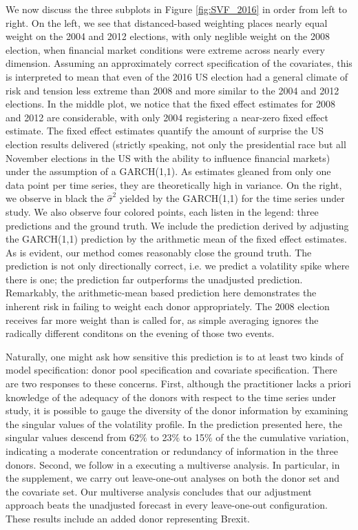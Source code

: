 \documentclass[11pt,3p,review,authoryear]{elsarticle}
\theoremstyle{definition}
\begin{document}
We now discuss the three subplots in Figure \ref{fig:SVF_2016} in order from left to right.  On the left, we see that distanced-based weighting places nearly equal weight on the 2004 and 2012 elections, with only neglible weight on the 2008 election, when financial market conditions were extreme across nearly every dimension.  Assuming an approximately correct specification of the covariates, this is interpreted to mean that even of the 2016 US election had a general climate of risk and tension less extreme than 2008 and more similar to the 2004 and 2012 elections.  In the middle plot, we notice that the fixed effect estimates for 2008 and 2012 are considerable, with only 2004 registering a near-zero fixed effect estimate.  The fixed effect estimates quantify the amount of surprise the US election results delivered (strictly speaking, not only the presidential race but all November elections in the US with the ability to influence financial markets) under the assumption of a GARCH(1,1).  As estimates gleaned from only one data point per time series, they are theoretically high in variance.  On the right, we observe in black the  $\hat\sigma^{2}$ yielded by the GARCH(1,1) for the time series under study.  We also observe four colored points, each listen in the legend: three predictions and the ground truth.  We include the prediction derived by adjusting the GARCH(1,1) prediction by the arithmetic mean of the fixed effect estimates.  As is evident, our method comes reasonably close the ground truth.  The prediction is not only directionally correct, i.e. we predict a volatility spike where there is one; the prediction far outperforms the unadjusted prediction.  Remarkably, the arithmetic-mean based prediction here demonstrates the inherent risk in failing to weight each donor appropriately.  The 2008 election receives far more weight than is called for, as simple averaging ignores the radically different conditons on the evening of those two events.  

Naturally, one might ask how sensitive this prediction is to at least two kinds of model specification: donor pool specification and covariate specification.  There are two responses to these concerns.  First, although the practitioner lacks a priori knowledge of the adequacy of the donors with respect to the time series under study, it is possible to gauge the diversity of the donor information by examining the singular values of the volatility profile.  In the prediction presented here, the singular values descend from 62$\%$ to 23$\%$ to 15$\%$ of the the cumulative variation, indicating a moderate concentration or redundancy of information in the three donors.  Second, we follow \citet{steegen2016increasing} in a executing a multiverse analysis.  In particular, in the supplement, we carry out leave-one-out analyses on both the donor set and the covariate set.  Our multiverse analysis concludes that our adjustment approach beats the unadjusted forecast in every leave-one-out configuration. These results include an added donor representing Brexit.
\end{document}
